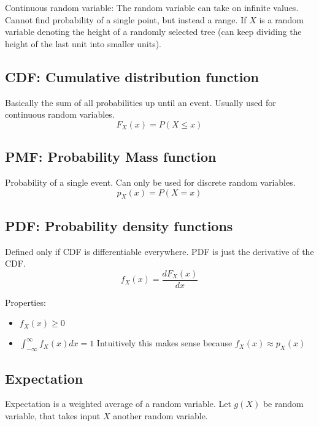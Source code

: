 \documentclass{article}
\begin{document}
    Continuous random variable: The random variable can take on infinite values. Cannot find probability of a single point, but instead a range. If $X$ is a random variable denoting the height of a randomly selected tree (can keep dividing the height of the last unit into smaller units).

    \subsection{CDF: Cumulative distribution function}
    Basically the sum of all probabilities up until an event. Usually used for continuous random variables.
    \begin{equation}
        F_X(x) = P(X \leq x)
    \end{equation}

    \subsection{PMF: Probability Mass function}
    Probability of a single event. Can only be used for discrete random variables.
    \begin{equation}
        p_X(x) = P(X=x)
    \end{equation}

    \subsection{PDF: Probability density functions}
    Defined only if CDF is differentiable everywhere. PDF is just the derivative of the CDF.
    \begin{equation}
        f_X(x)=\frac{dF_X(x)}{dx}
    \end{equation}

    Properties:
    \begin{itemize}
        \item $f_X(x) \geq 0$
        \item $\int_{-\infty}^{\infty} f_X(x) dx = 1$ Intuitively this makes sense because $f_X(x) \approx p_X(x)$
    \end{itemize}

    \subsection{Expectation}
    Expectation is a weighted average of a random variable. Let $g(X)$ be random variable, that takes input $X$ another random variable.
    \setlength{\parskip}{6pt}
\end{document}
